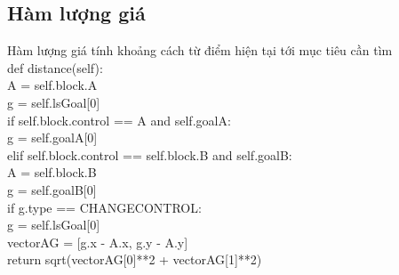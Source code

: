 \documentclass[11pt,a4paper]{article}
\begin{document}
\subsection{Hàm lượng giá}
\begin{flushleft}
\hspace{1 cm}	Hàm lượng giá tính khoảng cách từ điểm hiện tại tới mục tiêu cần tìm\\
\hspace{2 cm}	def distance(self):\\
\hspace{3 cm}	A = self.block.A\\
\hspace{3 cm}	g = self.lsGoal[0]\\
\hspace{3 cm}	if self.block.control == A and self.goalA:\\
\hspace{4 cm}	g = self.goalA[0]\\
\hspace{3 cm}	elif self.block.control == self.block.B and self.goalB:\\
\hspace{4 cm}	A = self.block.B\\
\hspace{4 cm}	g = self.goalB[0]\\
\hspace{3 cm}	if g.type == CHANGECONTROL:\\
\hspace{4 cm}	g = self.lsGoal[0]\\
\hspace{3 cm}	vectorAG = [g.x - A.x, g.y - A.y]\\
\hspace{3 cm}	return sqrt(vectorAG[0]**2 + vectorAG[1]**2)\\
\end{flushleft}
\end{document}
